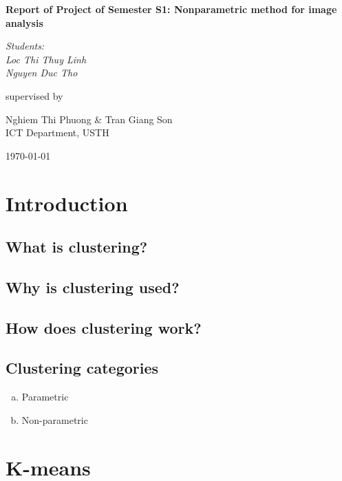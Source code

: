 \documentclass[13pt,a4paper]{report}
\begin{document}
	
\begin{titlepage}
	\centering
	\vspace{2cm}
	{\huge\bfseries Report of Project of Semester S1: Nonparametric method for image analysis \par}
	\vspace{2cm}
	{\Large\itshape Students:\\
		Loc Thi Thuy Linh\\
		Nguyen Duc Tho\par}
	\vfill
	supervised by\par
	\large Nghiem Thi Phuong \& Tran Giang Son\\
	ICT Department, USTH\par
	\vfill
	{\large \today\par}
\end{titlepage}

\tableofcontents{}
\newpage

\section{Introduction}

\subsection{What is clustering?}

\subsection{Why is clustering used?}

\subsection{How does clustering work?}

\subsection{Clustering categories}
\begin{enumerate}[a.]
	\item Parametric
	\item Non-parametric
\end{enumerate}

\section{K-means}
\end{document}
